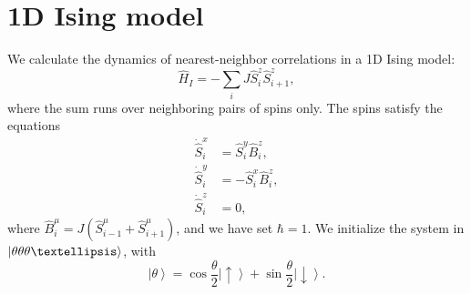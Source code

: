 \documentclass[pra,reprint,superscriptaddress]{revtex4-1}
\newcommand{\hH}{\hat{H}}
\newcommand{\ket}[1]{\left| #1 \right\rangle}
\newcommand{\hS}{\hat{S}}
\newcommand{\hB}{\hat{B}}
\begin{document}
\section{1D Ising model}\label{sec: Ising}
We calculate the dynamics of nearest-neighbor correlations in a 1D Ising model:
\begin{equation}\label{eqn: Hising}
\hH_I = -\sum_i J \hS_i^z\hS_{i+1}^z,
\end{equation}
where the sum runs over neighboring pairs of spins only.
The spins satisfy the equations
\begin{align}\label{eqn: IsingEOM}
\dot{\hS}_i^x &= \hS_i^y\hB_i^z,\nonumber\\
\dot{\hS}_i^y &= -\hS_i^x\hB_i^z,\\
\dot{\hS}_i^z &= 0,\nonumber
\end{align}
where $\hB_i^\mu = J\left(\hS_{i-1}^\mu+\hS_{i+1}^\mu\right)$, and we have set $\hbar=1$. We initialize the system in $\ket{\theta\theta\theta\textellipsis}$, with
\begin{equation}
\ket{\theta}=\cos\frac{\theta}{2}\ket{\uparrow}+\sin\frac{\theta}{2}\ket{\downarrow}.
\end{equation}
\end{document}
